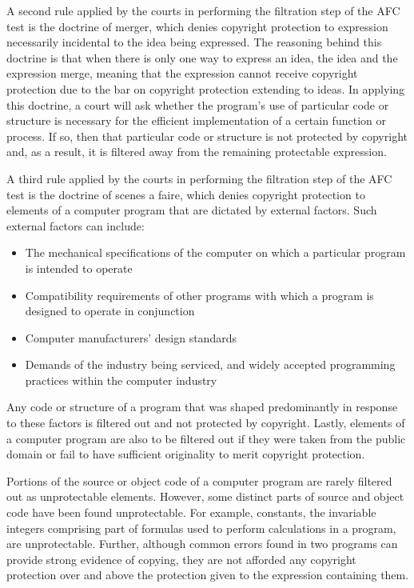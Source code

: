 A second rule applied by the courts in performing the filtration step of
the AFC test is the doctrine of merger, which denies copyright protection
to expression necessarily incidental to the idea being expressed. The
reasoning behind this doctrine is that when there is only one way to
express an idea, the idea and the expression merge, meaning that the
expression cannot receive copyright protection due to the bar on copyright
protection extending to ideas. In applying this doctrine, a court will ask
whether the program's use of particular code or structure is necessary for
the efficient implementation of a certain function or process. If so, then
that particular code or structure is not protected by copyright and, as a
result, it is filtered away from the remaining protectable expression.

A third rule applied by the courts in performing the filtration step of
the AFC test is the doctrine of scenes a faire, which denies copyright
protection to elements of a computer program that are dictated by external
factors. Such external factors can include:

\begin{itemize}

  \item The mechanical
specifications of the computer on which a particular program is intended
to operate

  \item Compatibility requirements of other programs with which a
program is designed to operate in conjunction

  \item Computer manufacturers'
design standards

  \item Demands of the industry being serviced, and widely accepted programming practices within the computer industry

\end{itemize}

Any code or structure of a program that was shaped predominantly in
response to these factors is filtered out and not protected by
copyright. Lastly, elements of a computer program are also to be filtered
out if they were taken from the public domain or fail to have sufficient
originality to merit copyright protection.

Portions of the source or object code of a computer program are rarely
filtered out as unprotectable elements. However, some distinct parts of
source and object code have been found unprotectable. For example,
constants, the invariable integers comprising part of formulas used to
perform calculations in a program, are unprotectable. Further, although
common errors found in two programs can provide strong evidence of
copying, they are not afforded any copyright protection over and above the
protection given to the expression containing them.

